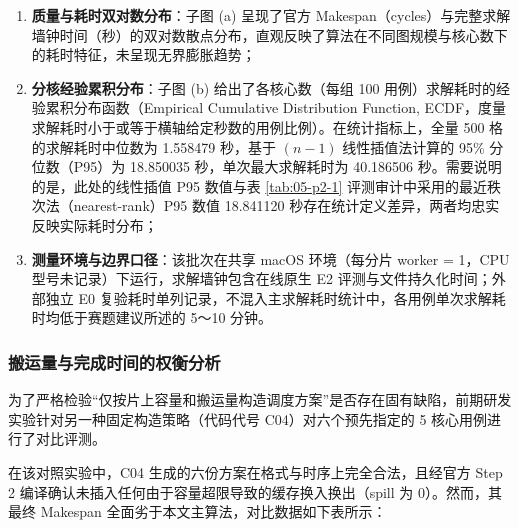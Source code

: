 \documentclass[anonymous,withtoc]{gmcm2026}
\providecommand{\tightlist}{\setlength{\itemsep}{0pt}\setlength{\parskip}{0pt}}
\begin{document}
\begin{enumerate}
\def\labelenumi{\arabic{enumi}.}
\tightlist
\item
  \textbf{质量与耗时双对数分布}：子图 (a) 呈现了官方 Makespan（cycles）与完整求解墙钟时间（秒）的双对数散点分布，直观反映了算法在不同图规模与核心数下的耗时特征，未呈现无界膨胀趋势；
\item
  \textbf{分核经验累积分布}：子图 (b) 给出了各核心数（每组 100 用例）求解耗时的经验累积分布函数（Empirical Cumulative Distribution Function, ECDF，度量求解耗时小于或等于横轴给定秒数的用例比例）。在统计指标上，全量 500 格的求解耗时中位数为 1.558479 秒，基于 \((n-1)\) 线性插值法计算的 95\% 分位数（P95）为 18.850035 秒，单次最大求解耗时为 40.186506 秒。需要说明的是，此处的线性插值 P95 数值与表 \ref{tab:05-p2-1} 评测审计中采用的最近秩次法（nearest-rank）P95 数值 18.841120 秒存在统计定义差异，两者均忠实反映实际耗时分布；
\item
  \textbf{测量环境与边界口径}：该批次在共享 macOS 环境（每分片 worker = 1，CPU 型号未记录）下运行，求解墙钟包含在线原生 E2 评测与文件持久化时间；外部独立 E0 复验耗时单列记录，不混入主求解耗时统计中，各用例单次求解耗时均低于赛题建议所述的 5～10 分钟。
\end{enumerate}

\subsubsection{搬运量与完成时间的权衡分析}

为了严格检验``仅按片上容量和搬运量构造调度方案''是否存在固有缺陷，前期研发实验针对另一种固定构造策略（代码代号 C04）对六个预先指定的 5 核心用例进行了对比评测。

在该对照实验中，C04 生成的六份方案在格式与时序上完全合法，且经官方 Step 2 编译确认未插入任何由于容量超限导致的缓存换入换出（spill 为 0）。然而，其最终 Makespan 全面劣于本文主算法，对比数据如下表所示：
\end{document}
